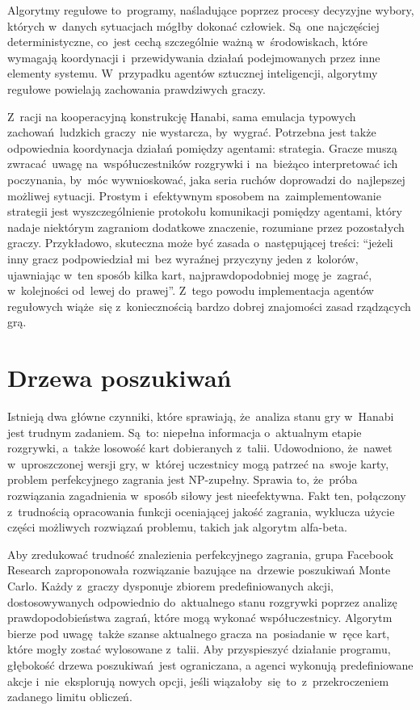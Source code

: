 \documentclass[declaration,shortabstract,inz]{iithesis}
\begin{document}
Algorytmy regułowe to~programy, naśladujące poprzez procesy decyzyjne wybory, których w~danych sytuacjach mógłby dokonać człowiek. Są~one najczęściej deterministyczne, co~jest cechą szczególnie ważną w~środowiskach, które wymagają koordynacji i~przewidywania działań podejmowanych przez inne elementy systemu. W~przypadku agentów sztucznej inteligencji, algorytmy regułowe powielają zachowania prawdziwych graczy.

Z~racji na kooperacyjną konstrukcję Hanabi, sama emulacja typowych zachowań ludzkich graczy~nie wystarcza, by~wygrać. Potrzebna jest także odpowiednia koordynacja działań pomiędzy agentami: strategia. Gracze muszą zwracać uwagę na~współuczestników rozgrywki i~na~bieżąco interpretować ich poczynania, by~móc wywnioskować, jaka seria ruchów doprowadzi do~najlepszej możliwej sytuacji. Prostym i~efektywnym sposobem na~zaimplementowanie strategii jest wyszczególnienie protokołu komunikacji pomiędzy agentami, który nadaje niektórym zagraniom dodatkowe znaczenie, rozumiane przez pozostałych graczy. Przykładowo, skuteczna może być zasada o~następującej treści: ``jeżeli inny gracz podpowiedział mi~bez wyraźnej przyczyny jeden z~kolorów, ujawniając w~ten sposób kilka kart, najprawdopodobniej mogę je~zagrać, w~kolejności od~lewej do~prawej''. Z~tego powodu implementacja agentów regułowych wiąże~się z~koniecznością bardzo dobrej znajomości zasad rządzących grą.

\section{Drzewa poszukiwań}
\label{sec:fb}

Istnieją dwa główne czynniki, które sprawiają, że~analiza stanu gry w~Hanabi jest trudnym zadaniem. Są~to: niepełna informacja o~aktualnym etapie rozgrywki, a~także losowość kart dobieranych z~talii. Udowodniono, że~nawet w~uproszczonej wersji gry, w~której uczestnicy mogą patrzeć na~swoje karty, problem perfekcyjnego zagrania jest NP-zupełny\cite{NP-Complete}. Sprawia to, że~próba rozwiązania zagadnienia w~sposób siłowy jest nieefektywna. Fakt ten, połączony z~trudnością opracowania funkcji oceniającej jakość zagrania, wyklucza użycie części możliwych rozwiązań problemu, takich jak algorytm alfa-beta.

Aby zredukować trudność znalezienia perfekcyjnego zagrania, grupa Facebook Research zaproponowała rozwiązanie bazujące na~drzewie poszukiwań Monte Carlo\cite{MCTS}. Każdy z~graczy dysponuje zbiorem predefiniowanych akcji, dostosowywanych odpowiednio do~aktualnego stanu rozgrywki poprzez analizę prawdopodobieństwa zagrań, które mogą wykonać współuczestnicy. Algorytm bierze pod uwagę także szanse aktualnego gracza na~posiadanie w~ręce kart, które mogły zostać wylosowane z~talii. Aby przyspieszyć działanie programu, głębokość drzewa poszukiwań jest ograniczana, a agenci wykonują predefiniowane akcje i~nie~eksplorują nowych opcji, jeśli wiązałoby~się to~z~przekroczeniem zadanego limitu obliczeń.
\end{document}
